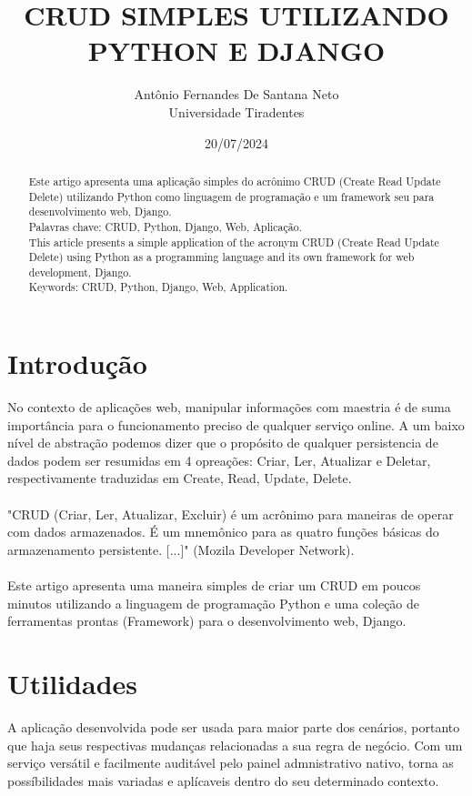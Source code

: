 \documentclass[11pt]{article} %
\title{CRUD SIMPLES UTILIZANDO PYTHON E DJANGO}
\author{Antônio Fernandes De Santana Neto \\ Universidade Tiradentes}
\date{20/07/2024}
\begin{document}
\maketitle
\begin{abstract}
Este artigo apresenta uma aplicação simples do acrônimo CRUD (Create Read Update Delete) utilizando Python como linguagem de programação e um framework seu para desenvolvimento web, Django. \\
Palavras chave: CRUD, Python, Django, Web, Aplicação. \\

This article presents a simple application of the acronym CRUD (Create Read Update Delete) using Python as a programming language and its own framework for web development, Django. \\
Keywords: CRUD, Python, Django, Web, Application.
\end{abstract}

\maketitle
\section{Introdução}
No contexto de aplicações web, manipular informações com maestria é de suma importância para o funcionamento preciso de qualquer serviço online. A um baixo nível de abstração podemos dizer que o propósito de qualquer persistencia de dados podem ser resumidas em 4 opreações: Criar, Ler, Atualizar e Deletar, respectivamente traduzidas em Create, Read, Update, Delete.\\\\
"CRUD (Criar, Ler, Atualizar, Excluir) é um acrônimo para maneiras de operar com dados armazenados. É um mnemônico para as quatro funções básicas do armazenamento persistente. [...]" (Mozila Developer Network).\\\\
Este artigo apresenta uma maneira simples de criar um CRUD em poucos minutos utilizando a linguagem de programação Python e uma coleção de ferramentas prontas (Framework) para o desenvolvimento web, Django.

\maketitle
\section{Utilidades}
A aplicação desenvolvida pode ser usada para maior parte dos cenários, portanto que haja seus respectivas mudanças relacionadas a sua regra de negócio. Com um serviço versátil e facilmente auditável pelo painel admnistrativo nativo, torna as possíbilidades mais variadas e aplícaveis dentro do seu determinado contexto.
\end{document}
